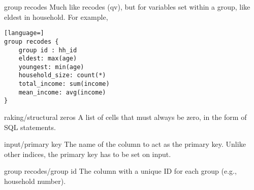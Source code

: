 \begin{key}{group recodes}
 Much like recodes (qv), but for variables set within a group, like
eldest in household.
For example,
\begin{lstlisting}[language=]
group recodes { 
    group id : hh_id
    eldest: max(age)
    youngest: min(age)
    household_size: count(*)
    total_income: sum(income)
    mean_income: avg(income)
}
\end{lstlisting}

\end{key}

\begin{key}{raking/structural zeros}
 A list of cells that must always be zero, 
     in the form of SQL statements. 
     
\end{key}

\begin{key}{input/primary key}
 The name of the column to act as the primary key. Unlike other indices, the primary key has to be set on input.
\end{key}

\begin{key}{group recodes/group id}
 The column with a unique ID for each group (e.g., household number).
\end{key}

